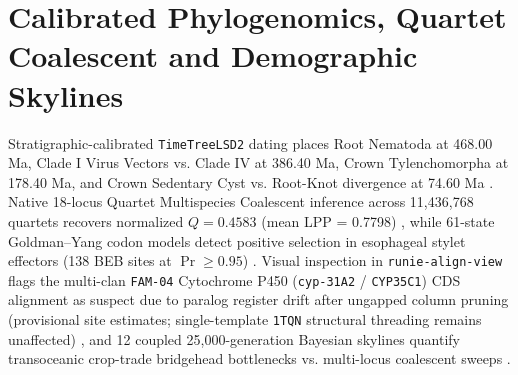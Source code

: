 \documentclass[10pt,letterpaper]{article}
\begin{document}
\section{Calibrated Phylogenomics, Quartet Coalescent and Demographic Skylines}
Stratigraphic-calibrated \texttt{TimeTreeLSD2} dating places Root Nematoda at 468.00 Ma, Clade I Virus Vectors vs. Clade IV at 386.40 Ma, Crown Tylenchomorpha at 178.40 Ma, and Crown Sedentary Cyst vs. Root-Knot divergence at 74.60 Ma \cite{ref2,ref3,ref5}. Native 18-locus Quartet Multispecies Coalescent inference across 11,436,768 quartets recovers normalized $Q = 0.4583$ (mean LPP = 0.7798) \cite{ref16}, while 61-state Goldman--Yang codon models detect positive selection in esophageal stylet effectors (138 BEB sites at $\Pr \ge 0.95$) \cite{ref10,ref18}. Visual inspection in \texttt{runie-align-view} flags the multi-clan \texttt{FAM-04} Cytochrome P450 (\texttt{cyp-31A2} / \texttt{CYP35C1}) CDS alignment as suspect due to paralog register drift after ungapped column pruning (provisional site estimates; single-template \texttt{1TQN} structural threading remains unaffected) \cite{ref15,ref18}, and 12 coupled 25,000-generation Bayesian skylines quantify transoceanic crop-trade bridgehead bottlenecks vs. multi-locus coalescent sweeps \cite{ref14,ref17}.
\end{document}
